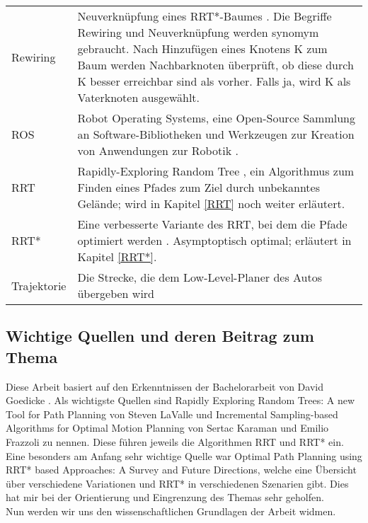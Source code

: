 \begin{tabularx}{\textwidth}{l|X}
Rewiring & Neuverknüpfung eines RRT*-Baumes \citep{KaFra10}. Die Begriffe Rewiring und Neuverknüpfung werden synomym gebraucht. Nach Hinzufügen eines Knotens K zum Baum werden Nachbarknoten überprüft, ob diese durch K besser erreichbar sind als vorher. Falls ja, wird K als Vaterknoten ausgewählt. \\
ROS & Robot Operating Systems, eine Open-Source Sammlung an Software-Bibliotheken und Werkzeugen zur Kreation von Anwendungen zur Robotik \citep{ROS}. \\
RRT & Rapidly-Exploring Random Tree \citep{Lav98}, ein Algorithmus zum Finden eines Pfades zum Ziel durch unbekanntes Gelände; wird in Kapitel \ref{RRT} noch weiter erläutert.\\
RRT* & Eine verbesserte Variante des RRT, bei dem die Pfade optimiert werden \citep{KaFra10}. Asymptoptisch optimal; erläutert in Kapitel \ref{RRT*}. \\
Trajektorie & Die Strecke, die dem Low-Level-Planer des Autos übergeben wird\\
\end{tabularx}

\subsection{Wichtige Quellen und deren Beitrag zum Thema}
Diese Arbeit basiert auf den Erkenntnissen der Bachelorarbeit von David Goedicke \citep{Goedicke18}. Als wichtigste Quellen sind \glqq Rapidly Exploring Random Trees: A new Tool for Path Planning\grqq \citep{Lav98} von Steven LaValle und \glqq Incremental Sampling-based Algorithms for Optimal Motion Planning\grqq \citep{KaFra10} von Sertac Karaman und Emilio Frazzoli zu nennen. Diese führen jeweils die Algorithmen RRT und RRT* ein. Eine besonders am Anfang sehr wichtige Quelle war \glqq Optimal Path Planning using RRT* based Approaches: A Survey and Future Directions\grqq \citep{NoKhaHa16}, welche eine Übersicht über verschiedene Variationen und RRT* in verschiedenen Szenarien gibt. Dies hat mir bei der Orientierung und Eingrenzung des Themas sehr geholfen. \\
Nun werden wir uns den wissenschaftlichen Grundlagen der Arbeit widmen.

